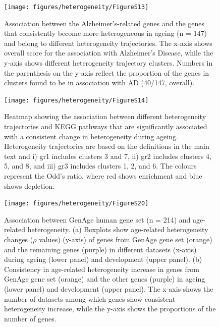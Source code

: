 \documentclass[12pt,twoside]{unicam}
\begin{document}
\begin{figure}

{\centering \texttt{[image: figures/heterogeneity/FigureS13]} 

}

\caption[Association between the Alzheimer's-related genes and the genes that consistently become more heterogeneous in ageing (n = 147) and belong to different heterogeneity trajectories.]{Association between the Alzheimer's-related genes and the genes that consistently become more heterogeneous in ageing (n = 147) and belong to different heterogeneity trajectories. The x-axis shows overall score for the association with Alzheimer's Disease, while the y-axis shows different heterogeneity trajectory clusters. Numbers in the parenthesis on the y-axis reflect the proportion of the genes in clusters found to be in association with AD (40/147, overall).}\label{fig:hetFigS13}
\end{figure}

\begin{figure}

{\centering \texttt{[image: figures/heterogeneity/FigureS14]} 

}

\caption[Association between different heterogeneity trajectories and KEGG pathways that are significantly associated with a consistent change in heterogeneity during ageing.]{Heatmap showing the association between different heterogeneity trajectories and KEGG pathways that are significantly associated with a consistent change in heterogeneity during ageing. Heterogeneity trajectories are based on the definitions in the main text and i) gr1 includes clusters 3 and 7, ii) gr2 includes clusters 4, 5, and 8, and iii) gr3 includes clusters 1, 2, and 6. The colours represent the Odd’s ratio, where red shows enrichment and blue shows depletion.}\label{fig:hetFigS14}
\end{figure}

\begin{figure}

{\centering \texttt{[image: figures/heterogeneity/FigureS20]} 

}

\caption[Association between GenAge human gene set and age-related heterogeneity.]{Association between GenAge human gene set (n = 214) and age-related heterogeneity. (a) Boxplots show age-related heterogeneity changes ($\rho$ values) (y-axis) of genes from GenAge gene set (orange) and the remaining genes (purple) in different datasets (x-axis) during ageing (lower panel) and development (upper panel). (b) Consistency in age-related heterogeneity increase in genes from GenAge gene set (orange) and the other genes (purple) in ageing (lower panel) and development (upper panel). The x-axis shows the number of datasets among which genes show consistent heterogeneity increase, while the y-axis shows the proportions of the number of genes.}\label{fig:hetFigS20}
\end{figure}
\end{document}
